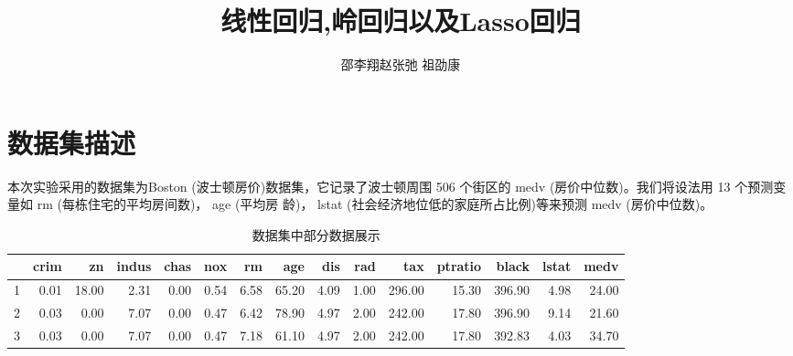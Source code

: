 \documentclass[cn]{elegantpaper}
\author{邵李翔\quad 赵张弛 \quad 祖劭康}
\title{线性回归,岭回归以及Lasso回归}
\begin{document}
    
\maketitle
\section{数据集描述}
本次实验采用的数据集为Boston (波士顿房价)数据集，它记录了波士顿周围 506 个街区的 medv
(房价中位数)。我们将设法用 13 个预测变量如 rm (每栋住宅的平均房间数)， age (平均房
龄)， lstat (社会经济地位低的家庭所占比例)等来预测 medv (房价中位数)。
\begin{table}[ht]
    \centering
    \caption{数据集中部分数据展示}
    \begin{tabular}{rrrrrrrrrrrrrrr}
      \hline
     & crim & zn & indus & chas & nox & rm & age & dis & rad & tax & ptratio & black & lstat & medv \\ 
      \hline
    1 & 0.01 & 18.00 & 2.31 & 0.00 & 0.54 & 6.58 & 65.20 & 4.09 & 1.00 & 296.00 & 15.30 & 396.90 & 4.98 & 24.00 \\ 
      2 & 0.03 & 0.00 & 7.07 & 0.00 & 0.47 & 6.42 & 78.90 & 4.97 & 2.00 & 242.00 & 17.80 & 396.90 & 9.14 & 21.60 \\ 
      3 & 0.03 & 0.00 & 7.07 & 0.00 & 0.47 & 7.18 & 61.10 & 4.97 & 2.00 & 242.00 & 17.80 & 392.83 & 4.03 & 34.70 \\ 
       \hline
    \end{tabular}
\end{table}
\end{document}
